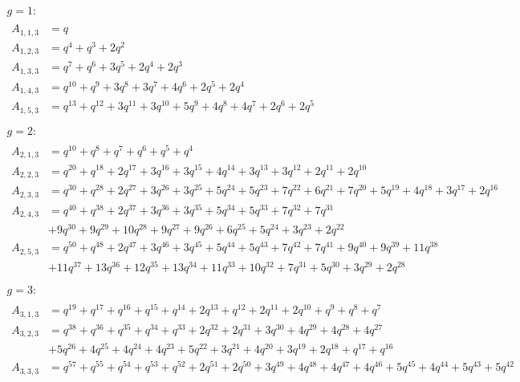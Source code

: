 \documentclass[11pt,english]{article}
\numberwithin{equation}{section}
\numberwithin{figure}{section}
\theoremstyle{definition}
\theoremstyle{plain}
\theoremstyle{remark}
\begin{document}
\[
\begin{array}{l}
g=1: \\
\begin{split}
A_{1,1,3} & = q \\
A_{1,2,3} & = q^4 + q^3 + 2  q^2 \\
A_{1,3,3} & = q^7 + q^6 + 3  q^5 + 2  q^4 + 2  q^3 \\
A_{1,4,3} & = q^{10} + q^9 + 3  q^8 + 3  q^7 + 4  q^6 + 2  q^5 + 2  q^4 \\
A_{1,5,3} & = q^{13} + q^{12} + 3  q^{11} + 3  q^{10} + 5  q^9 + 4  q^8 + 4  q^7 + 2  q^6 + 2  q^5
\end{split} \\
\\ 
g=2: \\
\begin{split}
A_{2,1,3} & = q^{10} + q^8 + q^7 + q^6 + q^5 + q^4 \\
A_{2,2,3} & = q^{20} + q^{18} + 2q^{17} + 3q^{16} + 3q^{15} + 4q^{14} + 3q^{13} + 3q^{12} + 2q^{11} + 2q^{10} \\
A_{2,3,3} & = q^{30} + q^{28} + 2q^{27} + 3q^{26} + 3q^{25} + 5q^{24} + 5q^{23} + 7q^{22} + 6q^{21} + 7q^{20} + 5q^{19} + 4q^{18} + 3q^{17} + 2q^{16} \\
A_{2,4,3} & = q^{40} + q^{38} + 2q^{37} + 3q^{36} + 3q^{35} + 5q^{34} + 5q^{33} + 7q^{32} + 7q^{31} \\
& + 9q^{30} + 9q^{29} + 10q^{28} + 9q^{27} + 9q^{26} + 6q^{25} + 5q^{24} + 3q^{23} + 2q^{22} \\
A_{2,5,3} & = q^{50} + q^{48} + 2q^{47} + 3q^{46} + 3q^{45} + 5q^{44} + 5q^{43} + 7q^{42} + 7q^{41} + 9q^{40} + 9q^{39} + 11q^{38} \\
& + 11q^{37} + 13q^{36} + 12q^{35} + 13q^{34} + 11q^{33} + 10q^{32} + 7q^{31} + 5q^{30} + 3q^{29} + 2q^{28}
\end{split} \\
\\
g=3: \\
\begin{split}
A_{3,1,3} & = q^{19} + q^{17} + q^{16} + q^{15} + q^{14} + 2q^{13} + q^{12} + 2q^{11} + 2q^{10} + q^{9} + q^{8} + q^{7} \\
A_{3,2,3} & = q^{38} + q^{36} + q^{35} + q^{34} + q^{33} + 2q^{32} + 2q^{31} + 3q^{30} + 4q^{29} + 4q^{28} + 4q^{27} \\
& + 5q^{26} + 4q^{25} + 4q^{24} + 4q^{23} + 5q^{22} + 3q^{21} + 4q^{20} + 3q^{19} + 2q^{18} + q^{17} + q^{16} \\
A_{3,3,3} & = q^{57} + q^{55} + q^{54} + q^{53} + q^{52} + 2q^{51} + 2q^{50} + 3q^{49} + 4q^{48} + 4q^{47} + 4q^{46} + 5q^{45} + 4q^{44} + 5q^{43} + 5q^{42}  \\

\end{split}
\end{array}\]
\end{document}
